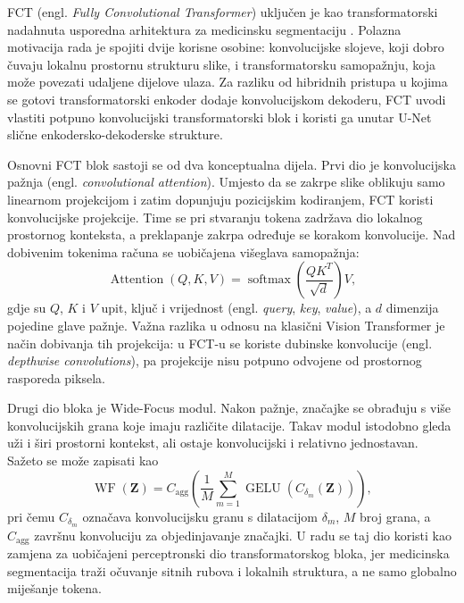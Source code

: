 \documentclass[a4paper,12pt,oneside]{article}
\begin{document}
FCT (engl. \textit{Fully Convolutional Transformer}) uključen je kao transformatorski nadahnuta usporedna arhitektura za medicinsku segmentaciju \cite{fct}. Polazna motivacija rada je spojiti dvije korisne osobine: konvolucijske slojeve, koji dobro čuvaju lokalnu prostornu strukturu slike, i transformatorsku samopažnju, koja može povezati udaljene dijelove ulaza. Za razliku od hibridnih pristupa u kojima se gotovi transformatorski enkoder dodaje konvolucijskom dekoderu, FCT uvodi vlastiti potpuno konvolucijski transformatorski blok i koristi ga unutar U-Net slične enkodersko-dekoderske strukture.

Osnovni FCT blok sastoji se od dva konceptualna dijela. Prvi dio je konvolucijska pažnja (engl. \textit{convolutional attention}). Umjesto da se zakrpe slike oblikuju samo linearnom projekcijom i zatim dopunjuju pozicijskim kodiranjem, FCT koristi konvolucijske projekcije. Time se pri stvaranju tokena zadržava dio lokalnog prostornog konteksta, a preklapanje zakrpa određuje se korakom konvolucije. Nad dobivenim tokenima računa se uobičajena višeglava samopažnja:
\begin{equation}\label{eq:fct_attention}
\operatorname{Attention}(Q, K, V) =
\operatorname{softmax}\left(\frac{QK^{T}}{\sqrt{d}}\right)V,
\end{equation}
gdje su $Q$, $K$ i $V$ upit, ključ i vrijednost (engl. \textit{query}, \textit{key}, \textit{value}), a $d$ dimenzija pojedine glave pažnje. Važna razlika u odnosu na klasični Vision Transformer je način dobivanja tih projekcija: u FCT-u se koriste dubinske konvolucije (engl. \textit{depthwise convolutions}), pa projekcije nisu potpuno odvojene od prostornog rasporeda piksela.

Drugi dio bloka je Wide-Focus modul. Nakon pažnje, značajke se obrađuju s više konvolucijskih grana koje imaju različite dilatacije. Takav modul istodobno gleda uži i širi prostorni kontekst, ali ostaje konvolucijski i relativno jednostavan. Sažeto se može zapisati kao
\begin{equation}\label{eq:fct_wide_focus}
\operatorname{WF}(\mathbf{Z}) =
C_{\mathrm{agg}}\left(\frac{1}{M}\sum_{m=1}^{M}
\operatorname{GELU}\left(C_{\delta_m}(\mathbf{Z})\right)\right),
\end{equation}
pri čemu $C_{\delta_m}$ označava konvolucijsku granu s dilatacijom $\delta_m$, $M$ broj grana, a $C_{\mathrm{agg}}$ završnu konvoluciju za objedinjavanje značajki. U radu se taj dio koristi kao zamjena za uobičajeni perceptronski dio transformatorskog bloka, jer medicinska segmentacija traži očuvanje sitnih rubova i lokalnih struktura, a ne samo globalno miješanje tokena.
\end{document}
